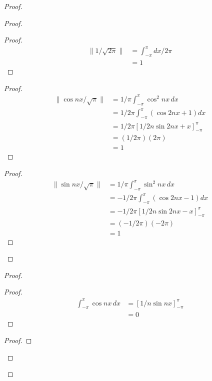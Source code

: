 \documentclass{book}
\theoremstyle{definition}
\begin{document}
\begin{proof}
\pf
{}
\begin{proof}
	\begin{proof}
		\pf
		\begin{align*}
			\| 1 / \sqrt{2 \pi} \| & = \int_{- \pi}^\pi dx / 2 \pi \\
			& = 1 
		\end{align*}
	\end{proof}
	\begin{proof}
		\pf
		\begin{align*}
			\| \cos n x / \sqrt{\pi} \| & = 1 / \pi \int_{-\pi}^\pi \cos^2 n x \, d x \\
			& = 1/2\pi \int_{-\pi}^\pi (\cos 2 n x + 1) dx \\
			& = 1/2\pi \left[ 1/2n \sin 2nx + x \right]_{-\pi}^\pi \\
			& = (1/2\pi) (2 \pi) \\
			& = 1
		\end{align*}
	\end{proof}
	\begin{proof}
		\pf
		\begin{align*}
			\| \sin n x / \sqrt{\pi} \| & = 1 / \pi \int_{-\pi}^\pi \sin^2 n x \, d x \\
			& = -1/2\pi \int_{-\pi}^\pi (\cos 2 n x - 1) dx \\
			& = -1/2\pi \left[ 1/2n \sin 2nx - x \right]_{-\pi}^\pi \\
			& = (-1/2\pi) (-2 \pi) \\
			& = 1
		\end{align*}
	\end{proof}
\end{proof}
\begin{proof}
	\begin{proof}
		\pf
		\begin{align*}
			\int_{-\pi}^\pi \cos nx \, dx
			& = \left[ 1/n \sin nx \right]_{-\pi}^\pi \\
			& = 0
		\end{align*}
	\end{proof}
	\begin{proof}

\end{proof}
\end{proof}
\end{proof}
\end{document}
